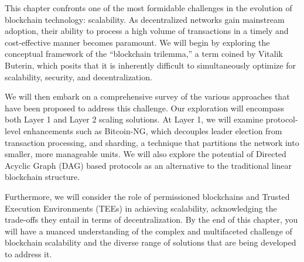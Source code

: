 

%
%
%

This chapter confronts one of the most formidable challenges in the
evolution of blockchain technology: scalability. As decentralized
networks gain mainstream adoption, their ability to process a high
volume of transactions in a timely and cost-effective manner becomes
paramount. We will begin by exploring the conceptual framework of the
``blockchain trilemma,'' a term coined by Vitalik Buterin, which posits
that it is inherently difficult to simultaneously optimize for
scalability, security, and decentralization.

We will then embark on a comprehensive survey of the various approaches
that have been proposed to address this challenge. Our exploration will
encompass both Layer 1 and Layer 2 scaling solutions. At Layer 1, we
will examine protocol-level enhancements such as Bitcoin-NG, which
decouples leader election from transaction processing, and sharding, a
technique that partitions the network into smaller, more manageable
units. We will also explore the potential of Directed Acyclic Graph
(DAG) based protocols as an alternative to the traditional linear
blockchain structure.

Furthermore, we will consider the role of permissioned blockchains and
Trusted Execution Environments (TEEs) in achieving scalability,
acknowledging the trade-offs they entail in terms of decentralization.
By the end of this chapter, you will have a nuanced understanding of the
complex and multifaceted challenge of blockchain scalability and the
diverse range of solutions that are being developed to address it.

